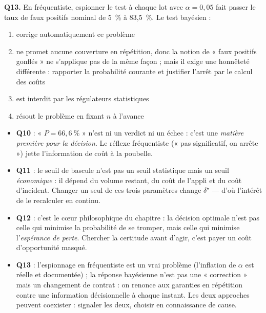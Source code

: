 \documentclass[11pt,a4paper]{article}
\begin{document}
\begin{qcmbox}[Questions 10 à 13]
\vspace{2mm}
\textbf{Q13.} En fréquentiste, espionner le test à chaque lot avec
$\alpha = 0{,}05$ fait passer le taux de faux positifs nominal de 5~\% à
83,5~\%. Le test bayésien :
\begin{enumerate}[label=\Alph*.), leftmargin=8mm, itemsep=0.3mm]
  \item corrige automatiquement ce problème
  \item ne promet aucune couverture en répétition, donc la notion de « faux
        positifs gonflés » ne s'applique pas de la même façon ; mais il
        exige une honnêteté différente : rapporter la probabilité courante
        et justifier l'arrêt par le calcul des coûts
  \item est interdit par les régulateurs statistiques
  \item résout le problème en fixant $n$ à l'avance
\end{enumerate}
\end{qcmbox}

\begin{piege}[Questions 10 à 13]
\begin{itemize}[leftmargin=4mm, itemsep=0.5mm]
  \item \textbf{Q10} : « $P = 66{,}6~\%$ » n'est ni un verdict ni un échec :
        c'est une \emph{matière première pour la décision}. Le réflexe
        fréquentiste (« pas significatif, on arrête ») jette l'information
        de coût à la poubelle.
  \item \textbf{Q11} : le seuil de bascule n'est pas un seuil statistique
        mais un seuil \emph{économique} : il dépend du volume restant, du
        coût de l'appli et du coût d'incident. Changer un seul de ces trois
        paramètres change $\delta^\star$ --- d'où l'intérêt de le recalculer
        en continu.
  \item \textbf{Q12} : c'est le cœur philosophique du chapitre : la décision
        optimale n'est pas celle qui minimise la probabilité de se tromper,
        mais celle qui minimise l'\emph{espérance de perte}. Chercher la
        certitude avant d'agir, c'est payer un coût d'opportunité masqué.
  \item \textbf{Q13} : l'espionnage en fréquentiste est un vrai problème
        (l'inflation de $\alpha$ est réelle et documentée) ; la réponse
        bayésienne n'est pas une « correction » mais un changement de
        contrat : on renonce aux garanties en répétition contre une
        information décisionnelle à chaque instant. Les deux approches
        peuvent coexister : signaler les deux, choisir en connaissance de
        cause.
\end{itemize}
\end{piege}
\end{document}
